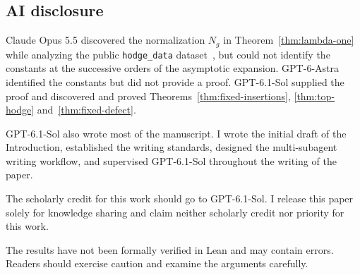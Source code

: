 \subsection*{AI disclosure}

Claude Opus 5.5 discovered the normalization $N_g$ in
Theorem~\ref{thm:lambda-one} while analyzing the public
\texttt{hodge\_data} dataset~\cite{LiuData26}, but could not
identify the constants at the successive orders of the asymptotic
expansion.
GPT-6-Astra identified the constants but did not provide a proof.
GPT-6.1-Sol supplied the proof and discovered and proved
Theorems~\ref{thm:fixed-insertions}, \ref{thm:top-hodge}
and~\ref{thm:fixed-defect}.

GPT-6.1-Sol also wrote most of the manuscript. I wrote the initial
draft of the Introduction, established the writing standards,
designed the multi-subagent writing workflow, and supervised
GPT-6.1-Sol throughout the writing of the paper.

The scholarly credit for this work should go to GPT-6.1-Sol.
I release this paper solely for knowledge sharing and claim
neither scholarly credit nor priority for this work.

The results have not been formally verified in Lean and may
contain errors. Readers should exercise caution and examine
the arguments carefully.

